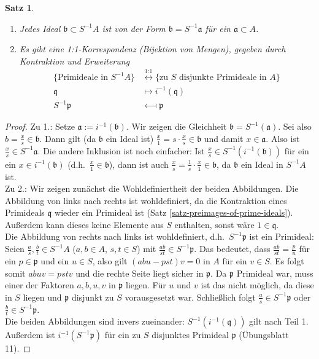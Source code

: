 \documentclass[reqno,12pt]{article}
\numberwithin{equation}{section}
\theoremstyle{plain}
\newtheorem{proposition}[thm]{Satz}
\theoremstyle{definition}
\begin{document}
\begin{proposition}
\begin{enumerate}
	\item Jedes Ideal $\mathfrak{b}\subset S^{-1}A$ ist von der Form $\mathfrak{b}=S^{-1}\mathfrak{a}$ für ein $\mathfrak{a}\subset A$.
	\item Es gibt eine 1:1-Korrespondenz (Bijektion von Mengen), gegeben durch Kontraktion und Erweiterung
	\begin{align*}
	\{\text{Primideale in $S^{-1}A$}\}&\overset{\text{1:1}}{\longleftrightarrow}\{\text{zu $S$ disjunkte Primideale in $A$}\}\\
	\mathfrak{q}&\longmapsto i^{-1}(\mathfrak{q})\\
	S^{-1}\mathfrak{p}&\longmapsfrom \mathfrak{p}
	\end{align*}
\end{enumerate}
\end{proposition}
\begin{proof}
Zu 1.: Setze $\mathfrak{a}:=i^{-1}(\mathfrak{b})$. Wir zeigen die Gleichheit $\mathfrak{b}=S^{-1}(\mathfrak{a})$. Sei also $b=\frac{x}{s}\in \mathfrak{b}$. Dann gilt (da $\mathfrak{b}$ ein Ideal ist) $\frac{x}{1}=s\cdot \frac{x}{s}\in \mathfrak{b}$ und damit $x\in \mathfrak{a}$. Also ist $\frac{x}{s}\in S^{-1}\mathfrak{a}$. Die andere Inklusion ist noch einfacher: Ist $\frac{x}{s}\in S^{-1}(i^{-1}(\mathfrak{b}))$ für ein ein $x\in i^{-1}(\mathfrak{b})$ (d.h.\ $\frac{x}{1}\in \mathfrak{b}$), dann ist auch $\frac{x}{s}=\frac{1}{s}\cdot \frac{x}{1}\in \mathfrak{b}$, da $\mathfrak{b}$ ein Ideal in $S^{-1}A$ ist.\\
Zu 2.: Wir zeigen zunächst die Wohldefiniertheit der beiden Abbildungen.
Die Abbildung von links nach rechts ist wohldefiniert, da die Kontraktion eines Primideals $\mathfrak{q}$ wieder ein Primideal ist (Satz \ref{satz-preimages-of-prime-ideals}). Außerdem kann dieses keine Elemente aus $S$ enthalten, sonst wäre $1 \in \mathfrak{q}$.\\
Die Abbildung von rechts nach links ist wohldefiniert, d.h.\ $S^{-1}\mathfrak{p}$ ist ein Primideal: Seien $\frac{a}{s},\frac{b}{t}\in S^{-1}A$ ($a,b\in A$, $s,t\in S$) mit $\frac{ab}{st}\in S^{-1}\mathfrak{p}$. Das bedeutet, dass $\frac{ab}{st}=\frac{p}{u}$ für ein $p\in \mathfrak{p}$ und ein $u\in S$, also gilt $(abu-pst)v=0$ in $A$ für ein $v\in S$. Es folgt somit $abuv=pstv$ und die rechte Seite liegt sicher in $\mathfrak{p}$. Da $\mathfrak{p}$ Primideal war, muss einer der Faktoren $a,b,u,v$ in $\mathfrak{p}$ liegen. Für $u$ und $v$ ist das nicht möglich, da diese in $S$ liegen und $\mathfrak{p}$ disjunkt zu $S$ vorausgesetzt war. Schließlich folgt $\frac{a}{s}\in S^{-1}\mathfrak{p}$ oder $\frac{b}{t}\in S^{-1}\mathfrak{p}$.\\
Die beiden Abbildungen sind invers zueinander: $S^{-1}(i^{-1}(\mathfrak{q}))$ gilt nach Teil 1. Außerdem ist $i^{-1}(S^{-1}\mathfrak{p})$ für ein zu $S$ disjunktes Primideal $\mathfrak{p}$ (Übungsblatt 11).
\end{proof}
\end{document}
